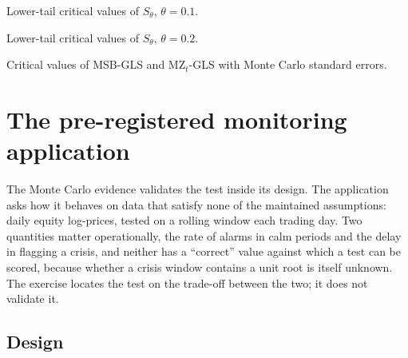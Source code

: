 \documentclass[11pt]{article}
\begin{document}
\begin{table}[htbp]
\centering
\caption{Lower-tail critical values of $S_\theta$, $\theta = 0.1$.}
\label{tab:crit0p1}
\small
\begin{adjustbox}{max width=\textwidth}

\end{adjustbox}
\end{table}

\begin{table}[htbp]
\centering
\caption{Lower-tail critical values of $S_\theta$, $\theta = 0.2$.}
\label{tab:crit0p2}
\small
\begin{adjustbox}{max width=\textwidth}

\end{adjustbox}
\end{table}

\begin{table}[htbp]
\centering
\caption{Critical values of MSB-GLS and MZ$_t$-GLS with Monte Carlo standard errors.}
\label{tab:critMSBse}
\small
\begin{adjustbox}{max width=\textwidth}

\end{adjustbox}
\par\medskip\begin{minipage}{\textwidth}\footnotesize

\end{minipage}
\end{table}

\FloatBarrier
\section{The pre-registered monitoring application}\label{supp:s9}


The Monte Carlo evidence validates the test inside its design. The
application asks how it behaves on data that satisfy none of the
maintained assumptions: daily equity log-prices, tested on a rolling
window each trading day. Two quantities matter operationally, the rate of
alarms in calm periods and the delay in flagging a crisis, and neither
has a ``correct'' value against which a test can be scored, because
whether a crisis window contains a unit root is itself unknown. The
exercise locates the test on the trade-off between the two; it does not
validate it.

\subsection*{Design}
\end{document}
